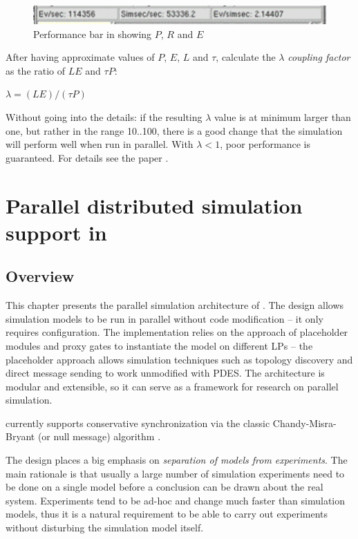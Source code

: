 \begin{figure}[htbp]
  \begin{center}
    \includegraphics{figures/perfbar-screenshot}
    \caption{Performance bar in {\opp} showing $P$, $R$ and $E$}
    \label{fig:perfbar-screenshot}
  \end{center}
\end{figure}

After having approximate values of $P$, $E$, $L$ and $\tau$,
calculate the $\lambda$ \textit{coupling factor} as the ratio of $LE$ and $\tau P$:

$\lambda = (LE) / (\tau P)$

Without going into the details: if the resulting $\lambda$ value is at
minimum larger than one, but rather in the range 10..100, there is
a good change that the simulation will perform well when run in
parallel. With $\lambda < 1$, poor performance is guaranteed.
For details see the paper \cite{}.


\section{Parallel distributed simulation support in {\opp}}

\subsection{Overview}

This chapter presents the parallel simulation architecture
of {\opp}. The design allows simulation models to be run
in parallel without code modification -- it only requires configuration.
The implementation relies on the approach of placeholder modules
and proxy gates to instantiate the model on different LPs --
the placeholder approach allows simulation techniques such as
topology discovery and direct message sending to work unmodified with
PDES. The architecture is modular and extensible, so it can
serve as a framework for research on parallel simulation.

{\opp} currently supports conservative synchronization
via the classic Chandy-Misra-Bryant (or null message) algorithm
\cite{chandymisra79}.

The {\opp} design places a big emphasis on
\textit{separation of models from experiments}. The main rationale
is that usually a large number of simulation experiments need to be done
on a single model before a conclusion can be drawn about the real system.
Experiments tend to be ad-hoc and change much faster than simulation
models, thus it is a natural requirement to be able to
carry out experiments without disturbing the simulation model itself.

